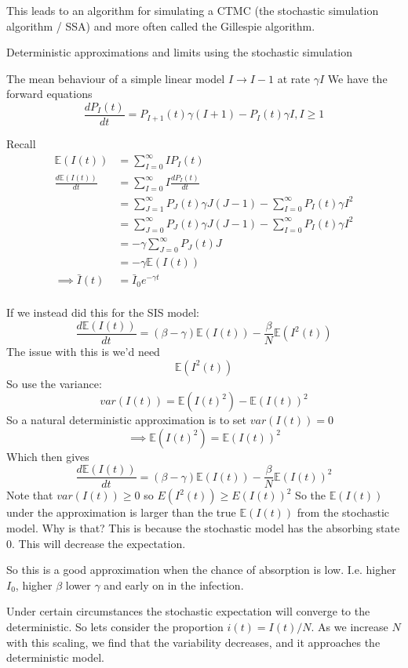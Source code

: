 \documentclass{X:/Documents/Coding/Latex/myassignment}
\begin{document}
This leads to an algorithm for simulating a CTMC (the stochastic simulation algorithm / SSA) and more often called the Gillespie algorithm. 






Deterministic approximations and limits using the stochastic simulation

The mean behaviour of a simple linear model
$I \to I-1$ at rate $\gamma I$
We have the forward equations
\[\frac{dP_I(t)}{dt} = P_{I+1}(t) \gamma(I+1) - P_I(t) \gamma I, I \geq 1\]

Recall
\begin{align*}
    \mathbb{E}(I(t)) &= \sum_{I=0}^\infty IP_I(t)\\
\frac{d\mathbb{E}(I(t))}{dt} &= \sum_{I=0}^\infty I\frac{dP_I(t)}{dt}\\
&= \sum_{J=1}^\infty P_{J}(t) \gamma J(J-1) - \sum_{I=0}^\infty P_I(t) \gamma I^2\\
&= \sum_{J=0}^\infty P_{J}(t) \gamma J(J-1) - \sum_{I=0}^\infty P_I(t) \gamma I^2\\
&= -\gamma \sum_{J=0}^\infty P_{J}(t) J\\
&= -\gamma \mathbb{E}(I(t))\\
\implies \bar{I}(t) &= \bar{I}_0 e^{-\gamma t}\\
\end{align*}

If we instead did this for the SIS model:
\[\frac{d \mathbb{E}(I(t))}{dt} = (\beta - \gamma) \mathbb{E}(I(t)) - \frac\beta N \mathbb{E}(I^2(t))\]
The issue with this is we'd need
\[\mathbb{E}(I^2(t))\]
So use the variance:
\[var(I(t)) = \mathbb{E}(I(t)^2) - \mathbb{E}(I(t))^2\]
So a natural deterministic approximation is to set $var(I(t)) = 0$
\[\implies \mathbb{E}(I(t)^2) = \mathbb{E}(I(t))^2\]
Which then gives
\[\frac{d \mathbb{E}(I(t))}{dt} = (\beta - \gamma) \mathbb{E}(I(t)) - \frac\beta N \mathbb{E}(I(t))^2\]
Note that $var(I(t)) \geq 0$ so $E(I^2(t)) \geq E(I(t))^2$
So the $\mathbb{E}(I(t))$ under the approximation is larger than the true $\mathbb{E}(I(t))$ from the stochastic model. Why is that?
This is because the stochastic model has the absorbing state $0$. This will decrease the expectation.

So this is a good approximation when the chance of absorption is low. I.e. higher $I_0$, higher $\beta$ lower $\gamma$ and early on in the infection.

Under certain circumstances the stochastic expectation will converge to the deterministic.
So lets consider the proportion $i(t) = I(t)/N$.
As we increase $N$ with this scaling, we find that the variability decreases, and it approaches the deterministic model.
\end{document}
